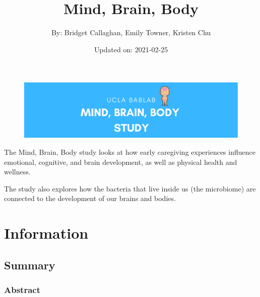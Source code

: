 \documentclass[]{book}
\title{Mind, Brain, Body}
\author{By: Bridget Callaghan, Emily Towner, Kristen Chu}
\date{Updated on: 2021-02-25}
\begin{document}
\maketitle

{
\setcounter{tocdepth}{1}
\tableofcontents
}
\hypertarget{section}{%
\chapter{}\label{section}}

\begin{figure}
\centering
\includegraphics{images/index/banner.png}
\caption{}
\end{figure}

The Mind, Brain, Body study looks at how early caregiving experiences influence emotional, cognitive, and brain development, as well as physical health and wellness.

The study also explores how the bacteria that live inside us (the microbiome) are connected to the development of our brains and bodies.

\hypertarget{information}{%
\chapter{Information}\label{information}}

\hypertarget{summary}{%
\section{Summary}\label{summary}}

\hypertarget{abstract}{%
\subsection{Abstract}\label{abstract}}
\end{document}
